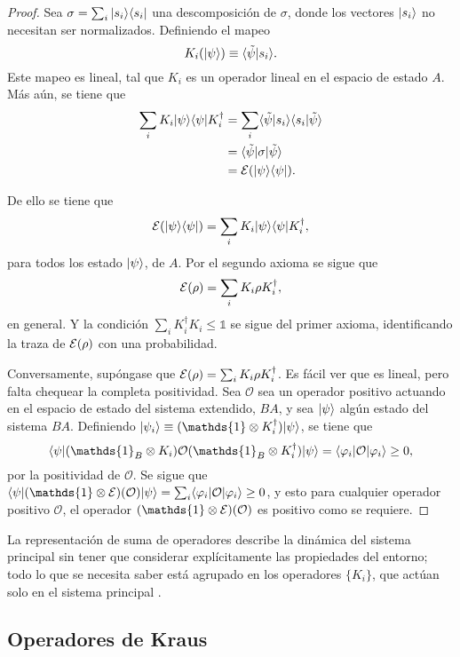\begin{proof}
Sea $\sigma=\sum_i|s_i\rangle \langle s_i|$ una descomposición de $\sigma$, donde los vectores $|s_i\rangle$ no necesitan ser normalizados. Definiendo el mapeo \[K_i(|\psi\rangle) \equiv \langle\tilde{\psi}|s_i\rangle.\] Este mapeo es lineal, tal que $K_i$ es un operador lineal en el espacio de estado $A$. Más aún, se tiene que 
\begin{equation}
    \begin{split}
       \sum_i K_i |\psi \rangle \langle \psi |K_i^\dagger&=\sum_i  \langle\tilde{\psi}|s_i\rangle \langle s_i|\tilde{\psi}\rangle\\
        &=\langle \tilde \psi |\sigma |\tilde{\psi}\rangle\\
        &=\mathcal{E}(|\psi \rangle \langle\psi|).\\
    \end{split}
\end{equation}



De ello se tiene que  \[\mathcal{E}(|\psi\rangle \langle \psi|)=\sum_i K_i |\psi \rangle \langle \psi |K_i^\dagger,\] para todos los estado $|\psi\rangle$, de $A$. Por el segundo axioma se sigue que \[\mathcal{E}(\rho)=\sum_i K_i \rho K_i^\dagger,\] en general. Y la condición $\sum_i K_i^\dagger K_i\le \mathds{1}$ se sigue del primer axioma, identificando la traza de $\mathcal{E}(\rho) $ con una probabilidad.


Conversamente, supóngase que $\mathcal{E}(\rho)=\sum_i K_i \rho K_i^\dagger$. Es fácil ver que es lineal, pero falta chequear la completa positividad. Sea $\mathcal{O}$ sea un operador positivo actuando en el espacio de estado del sistema extendido, $BA$, y sea $|\psi \rangle$ algún estado del sistema $BA$. Definiendo $|\psi_i\ra \equiv (\mathds{1}\otimes K_i^\dagger)|\psi\ra$, se tiene que \[\la \psi |(\mathds{1}_B\otimes K_i)\mathcal{O}(\mathds{1}_B\otimes K_i^\dagger)|\psi\ra=\la \varphi_i |\mathcal{O}|\varphi_i\ra \ge 0,\] por la positividad de $\mathcal{O}$. Se sigue que $\la \psi| (\mathds{1}\otimes\E)(\mathcal{O})|\psi\ra=\sum_i \la \varphi_i|\mathcal{O}|\varphi_i\ra \ge 0$, y esto para cualquier operador positivo $\mathcal{O}$, el operador $(\mathds{1}\otimes \E)(\mathcal{O})$ es positivo como se requiere.
\end{proof}

La representación de suma de operadores describe la dinámica del sistema principal sin tener que considerar explícitamente las propiedades del entorno; todo lo que se necesita saber está agrupado en los operadores $\{K_i\}$, que actúan solo en el sistema principal {\cite{nielsen_chuang_2010}}.

\subsection{Operadores de Kraus}

